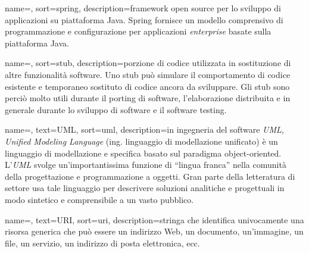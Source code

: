 {
	name=,
	sort=spring,
	description={framework open source per lo sviluppo di applicazioni su piattaforma Java. Spring fornisce un modello comprensivo di programmazione e configurazione per applicazioni \emph{enterprise} basate sulla piattaforma Java.}
}

{
	name=,
	sort=stub,
	description={porzione di codice utilizzata in sostituzione di altre funzionalità software. Uno stub può simulare il comportamento di codice esistente e temporaneo sostituto di codice ancora da sviluppare. Gli stub sono perciò molto utili durante il porting di software, l'elaborazione distribuita e in generale durante lo sviluppo di software e il software testing.}
}
		
{
    name=,
    text=UML,
    sort=uml,
    description={in ingegneria del software \emph{UML, Unified Modeling Language} (ing. linguaggio di modellazione unificato) è un linguaggio di modellazione e specifica basato sul paradigma object-oriented. L'\emph{UML} svolge un'importantissima funzione di ``lingua franca'' nella comunità della progettazione e programmazione a oggetti. Gran parte della letteratura di settore usa tale linguaggio per descrivere soluzioni analitiche e progettuali in modo sintetico e comprensibile a un vasto pubblico.}
}

{
	name=,
	text=URI,
	sort=uri,
	description={stringa che identifica univocamente una risorsa generica che può essere un indirizzo Web, un documento, un'immagine, un file, un servizio, un indirizzo di posta elettronica, ecc.}
}
